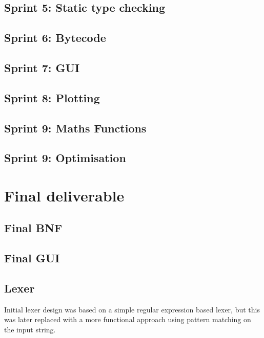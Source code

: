 \documentclass[a4paper, oneside, 11pt]{report}
\begin{document}
\section{Sprint 5: Static type checking}\label{sec:static-type-checking}

\section{Sprint 6: Bytecode}\label{sec:bytecode}

\section{Sprint 7: GUI}\label{sec:gui}

\section{Sprint 8: Plotting}\label{sec:plotting1}

\section{Sprint 9: Maths Functions}\label{sec:maths-funcs}

\section{Sprint 9: Optimisation}\label{sec:optimisation1}

\chapter{Final deliverable}\label{ch:impl}

\section{Final BNF}\label{sec:final-bnf}

\section{Final GUI}\label{sec:final-gui}

\section{Lexer}\label{sec:lexer}

Initial lexer design was based on a simple regular expression based lexer, but this was later replaced with a more
functional approach using pattern matching on the input string.
\end{document}
